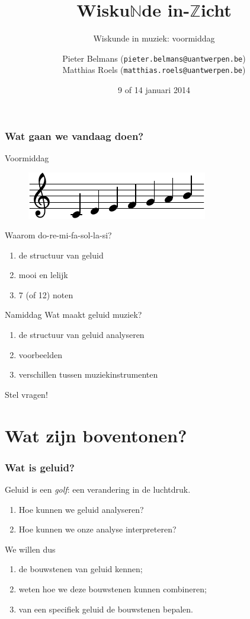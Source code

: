 \documentclass[compress, darktitle, framenumber, totalframenumber, handout]{beamer}
\title{Wisku$\mathbb{N}$de in-$\mathbb{Z}$icht}
\subtitle{Wiskunde in muziek: voormiddag}
\author{Pieter Belmans (\texttt{pieter.belmans@uantwerpen.be}) \\ Matthias Roels (\texttt{matthias.roels@uantwerpen.be})}
\date{9 of 14 januari 2014}
\begin{document}
\begin{frame}
  \titlepage
\end{frame}

\begin{frame}
  \frametitle{Wat gaan we vandaag doen?}

  \begin{block}{Voormiddag}
    \begin{figure}
      \centering
      \includegraphics{scores/scale-cropped}
    \end{figure}
    Waarom do-re-mi-fa-sol-la-si?
    \begin{enumerate}
      \item de structuur van geluid
      \item mooi en lelijk
      \item 7 (of 12) noten
    \end{enumerate}
  \end{block}

  \pause

  \begin{block}{Namiddag}
    Wat maakt geluid muziek?
    \begin{enumerate}
      \item de structuur van geluid analyseren
      \item voorbeelden
      \item verschillen tussen muziekinstrumenten
    \end{enumerate}
  \end{block}

  Stel vragen!
\end{frame}


\section{Wat zijn boventonen?}

\begin{frame}
  \frametitle{Wat is geluid?}

  Geluid is een \emph{golf}: een verandering in de luchtdruk.
  \pause
  \begin{enumerate}
    \item Hoe kunnen we geluid analyseren?
    \item Hoe kunnen we onze analyse interpreteren?
  \end{enumerate}
  \pause
  We willen dus
  \begin{enumerate}
    \item de bouwstenen van geluid kennen;
    \item weten hoe we deze bouwstenen kunnen combineren;
    \item van een specifiek geluid de bouwstenen bepalen.
  \end{enumerate}
\end{frame}
\end{document}
